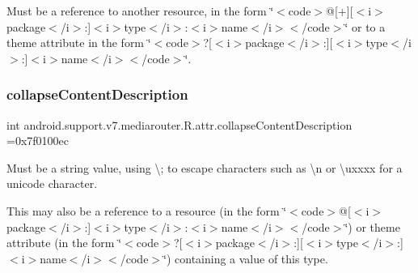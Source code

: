 Must be a reference to another resource, in the form \char`\"{}$<$code$>$@\mbox{[}+\mbox{]}\mbox{[}$<$i$>$package$<$/i$>$\+:\mbox{]}$<$i$>$type$<$/i$>$\+:$<$i$>$name$<$/i$>$$<$/code$>$\char`\"{} or to a theme attribute in the form \char`\"{}$<$code$>$?\mbox{[}$<$i$>$package$<$/i$>$\+:\mbox{]}\mbox{[}$<$i$>$type$<$/i$>$\+:\mbox{]}$<$i$>$name$<$/i$>$$<$/code$>$\char`\"{}. \mbox{\label{classandroid_1_1support_1_1v7_1_1mediarouter_1_1R_1_1attr_a19e837e1a95143b4a69da4c398cb0dfe}} 
\subsubsection{\texorpdfstring{collapse\+Content\+Description}{collapseContentDescription}}
{\footnotesize\ttfamily int android.\+support.\+v7.\+mediarouter.\+R.\+attr.\+collapse\+Content\+Description =0x7f0100ec\hspace{0.3cm}{\ttfamily [static]}}

Must be a string value, using \textquotesingle{}\textbackslash{};\textquotesingle{} to escape characters such as \textquotesingle{}\textbackslash{}n\textquotesingle{} or \textquotesingle{}\textbackslash{}uxxxx\textquotesingle{} for a unicode character. 

This may also be a reference to a resource (in the form \char`\"{}$<$code$>$@\mbox{[}$<$i$>$package$<$/i$>$\+:\mbox{]}$<$i$>$type$<$/i$>$\+:$<$i$>$name$<$/i$>$$<$/code$>$\char`\"{}) or theme attribute (in the form \char`\"{}$<$code$>$?\mbox{[}$<$i$>$package$<$/i$>$\+:\mbox{]}\mbox{[}$<$i$>$type$<$/i$>$\+:\mbox{]}$<$i$>$name$<$/i$>$$<$/code$>$\char`\"{}) containing a value of this type. \mbox{\label{classandroid_1_1support_1_1v7_1_1mediarouter_1_1R_1_1attr_aa7a18ef11d71b28d4906207ff89e82c8}} 
